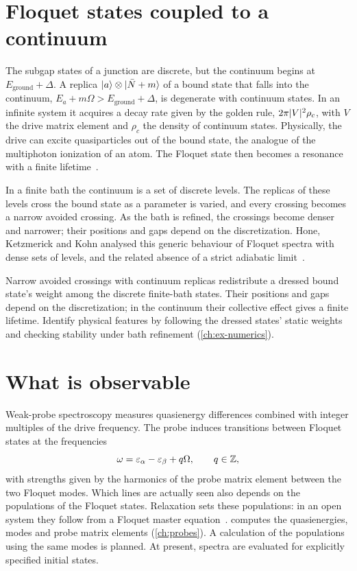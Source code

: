 \section{Floquet states coupled to a continuum}\label{sec:continuum}

The subgap states of a junction are discrete, but the continuum begins at
$E_{\mathrm{ground}}+\Delta$. A replica $\lvert a\rangle\otimes\lvert \bar N+m\rangle$ of a bound state that
falls into the continuum, $E_a+m\Omega>E_{\mathrm{ground}}+\Delta$, is degenerate with
continuum states. In an infinite system it acquires a decay rate given by the golden rule,
$2\pi\lvert V\rvert^2\rho_c$, with $V$ the drive matrix element and $\rho_c$ the density of
continuum states. Physically, the drive can excite quasiparticles out of the bound state,
the analogue of the multiphoton ionization of an atom. The Floquet state then becomes a
resonance with a finite lifetime~\cite{chu2004beyond,moiseyev2011non}.

In a finite bath the continuum is a set of discrete levels. The replicas of these levels
cross the bound state as a parameter is varied, and every crossing becomes a narrow avoided
crossing. As the bath is refined, the crossings become denser and narrower; their positions
and gaps depend on the discretization. Hone, Ketzmerick and Kohn analysed this generic
behaviour of Floquet spectra with dense sets of levels, and the related absence of a strict
adiabatic limit~\cite{hone1997time,hone2009statistical}.

\begin{caution}
Narrow avoided crossings with continuum replicas redistribute a dressed bound
state's weight among the discrete finite-bath states. Their positions and gaps
depend on the discretization; in the continuum their collective effect gives a
finite lifetime. Identify physical features by following the dressed states'
static weights and checking stability under bath refinement (\cref{ch:ex-numerics}).
\end{caution}

\section{What is observable}

Weak-probe spectroscopy measures quasienergy differences combined with integer
multiples of the drive frequency. The probe induces transitions between Floquet states at the
frequencies
\begin{equation}\label{eq:transitions}
  \omega=\varepsilon_\alpha-\varepsilon_\beta+q\Omega,\qquad q\in\mathbb Z ,
\end{equation}
with strengths given by the harmonics of the probe matrix element between the two Floquet
modes. Which lines are actually seen also depends on the populations of the Floquet
states. Relaxation sets these populations: in an open system they follow from a Floquet
master equation~\cite{blumel1991dynamical,kohler1997floquet,breuer2007theory,hone2009statistical}.
\pkg{} computes the quasienergies, modes and probe matrix elements
(\cref{ch:probes}). A calculation of the populations using the same modes is planned.
At present, spectra are evaluated for explicitly specified initial states.

